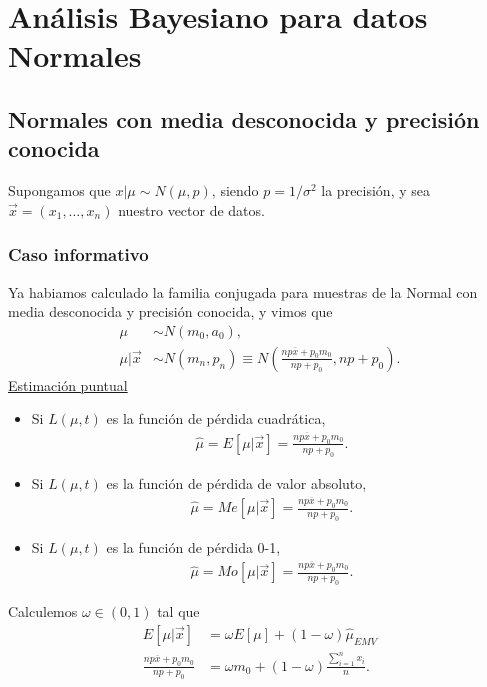 \section{Análisis Bayesiano para datos Normales}

\subsection{Normales con media desconocida y precisión conocida}
\noindent Supongamos que $x | \mu \sim N(\mu,p)$, siendo $p=1/\sigma^2$ la precisión, y sea $\vec{x} = (x_1, \ldots, x_n)$ nuestro vector de datos.

\subsubsection{Caso informativo}
\noindent Ya habiamos calculado la familia conjugada para muestras de la Normal con media desconocida y precisión conocida, y vimos que
\begin{align*}
    \mu &\sim N(m_0,a_0), \\
    \mu | \vec{x} &\sim N(m_n,p_n) \equiv N\left(\frac{np \overline{x} + p_0m_0}{np + p_0}, np + p_0 \right).
\end{align*}
\noindent \underline{Estimación puntual}
\begin{itemize}
    \item Si $L(\mu,t)$ es la función de pérdida cuadrática, 
    \begin{align*}
        \widehat{\mu} = E[\mu |  \vec{x}] = \frac{np \overline{x} + p_0m_0}{np + p_0}.
    \end{align*}
    \item Si $L(\mu,t)$ es la función de pérdida de valor absoluto, 
        \begin{align*}
        \widehat{\mu} = Me[\mu |  \vec{x}] = \frac{np \overline{x} + p_0m_0}{np + p_0}.
    \end{align*}
    \item Si $L(\mu,t)$ es la función de pérdida 0-1, 
        \begin{align*}
        \widehat{\mu} = Mo[\mu |  \vec{x}] = \frac{np \overline{x} + p_0m_0}{np + p_0}.
    \end{align*}
\end{itemize}
Calculemos $\omega \in (0,1)$ tal que 
\begin{align*}
    E[\mu | \vec{x}] &= \omega E[\mu]  + (1 - \omega) \widehat{\mu }_{EMV}  \\
    \frac{np \overline{x} + p_0m_0}{np + p_0} &= \omega m_0 + (1-\omega) \frac{\sum_{i=1}^{n} x_i}{n}.
\end{align*}
